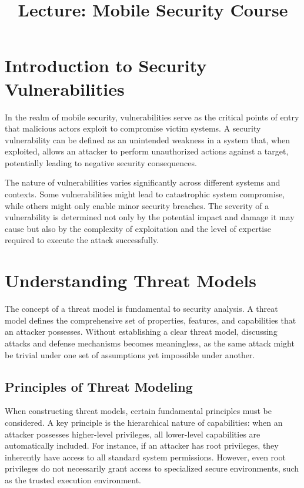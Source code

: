 \documentclass{article}
\title{Lecture: Mobile Security Course}
\author{}
\date{}
\begin{document}
\maketitle

\section{Introduction to Security Vulnerabilities}
In the realm of mobile security, vulnerabilities serve as the critical points of entry that malicious actors exploit to compromise victim systems. A security vulnerability can be defined as an unintended weakness in a system that, when exploited, allows an attacker to perform unauthorized actions against a target, potentially leading to negative security consequences.

The nature of vulnerabilities varies significantly across different systems and contexts. Some vulnerabilities might lead to catastrophic system compromise, while others might only enable minor security breaches. The severity of a vulnerability is determined not only by the potential impact and damage it may cause but also by the complexity of exploitation and the level of expertise required to execute the attack successfully.

\section{Understanding Threat Models}
The concept of a threat model is fundamental to security analysis. A threat model defines the comprehensive set of properties, features, and capabilities that an attacker possesses. Without establishing a clear threat model, discussing attacks and defense mechanisms becomes meaningless, as the same attack might be trivial under one set of assumptions yet impossible under another.

\subsection{Principles of Threat Modeling}
When constructing threat models, certain fundamental principles must be considered. A key principle is the hierarchical nature of capabilities: when an attacker possesses higher-level privileges, all lower-level capabilities are automatically included. For instance, if an attacker has root privileges, they inherently have access to all standard system permissions. However, even root privileges do not necessarily grant access to specialized secure environments, such as the trusted execution environment.
\end{document}
